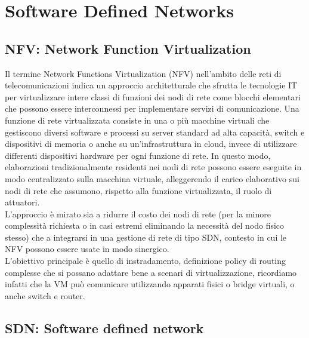 \documentclass{article}
\begin{document}
		\newpage
		\section{Software Defined Networks}
		\subsection{NFV: Network Function Virtualization}
		Il termine Network Functions Virtualization (NFV) nell'ambito delle reti di telecomunicazioni indica un approccio architetturale che sfrutta le tecnologie IT per virtualizzare intere classi di funzioni dei nodi di rete come blocchi elementari che possono essere interconnessi per implementare servizi di comunicazione.
		Una funzione di rete virtualizzata consiste in una o più macchine virtuali che gestiscono diversi software e processi su server standard ad alta capacità, switch e dispositivi di memoria o anche su un'infrastruttura in cloud, invece di utilizzare differenti dispositivi hardware per ogni funzione di rete.
		In questo modo, elaborazioni tradizionalmente residenti nei nodi di rete possono essere eseguite in modo centralizzato sulla macchina virtuale, alleggerendo il carico elaborativo sui nodi di rete che assumono, rispetto alla funzione virtualizzata, il ruolo di attuatori.\\
		L'approccio è mirato sia a ridurre il costo dei nodi di rete (per la minore complessità richiesta o in casi estremi eliminando la necessità del nodo fisico stesso) che a integrarsi in una gestione di rete di tipo SDN, contesto in cui le NFV possono essere usate in modo sinergico.
		\\L'obiettivo principale è quello di instradamento, definizione policy di routing complesse che si possano adattare bene a scenari di virtualizzazione, ricordiamo infatti che la VM può comunicare utilizzando apparati fisici o bridge virtuali, o anche switch e router.
		\newpage
		\subsection{SDN: Software defined network}
\end{document}
